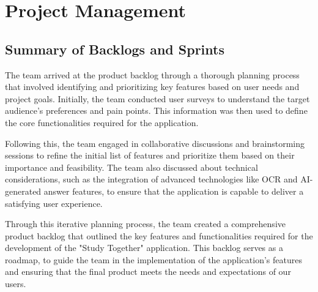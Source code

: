 
\chapter{Project Management}\label{ch:project_management}

\section{Summary of Backlogs and Sprints}

The team arrived at the product backlog through a thorough planning process that involved identifying and prioritizing key features based on user needs and project goals. Initially, the team conducted user surveys to understand the target audience's preferences and pain points. This information was then used to define the core functionalities required for the application.

Following this, the team engaged in collaborative discussions and brainstorming sessions to refine the initial list of features and prioritize them based on their importance and feasibility. The team also discussed about technical considerations, such as the integration of advanced technologies like OCR and AI-generated answer features, to ensure that the application is capable to deliver a satisfying user experience.

Through this iterative planning process, the team created a comprehensive product backlog that outlined the key features and functionalities required for the development of the "Study Together" application. This backlog serves as a roadmap, to guide the team in the implementation of the application's features and ensuring that the final product meets the needs and expectations of our users.

